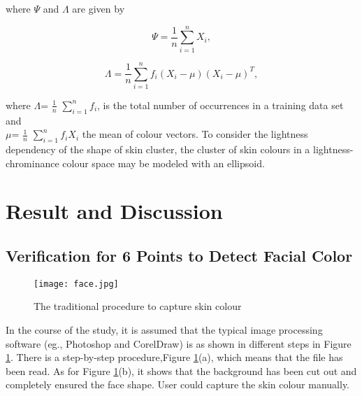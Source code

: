 \documentclass[acmsmall]{acmart}
\begin{document}
\noindent where $\Psi$ and $\Lambda$ are given by


\begin{equation}
\Psi=
\frac{1}{n}
\sum_{i=1}^{n}X_{i},
\end{equation}

\begin{equation}
\Lambda=
\frac{1}{n}
\sum_{i=1}^{n}f_{i}
(X_{i}-\mu)
(X_{i}-\mu)^T,
\end{equation}


\noindent where $\Lambda$=  
$\frac{1}{n}$
$\sum_{i=1}^{n}f_{i}$,
is the total number of occurrences in a training data set and \\
$\mu$=
$\frac{1}{n}$
$\sum_{i=1}^{n}f_{i}X_{i}$ 
the mean of colour vectors. To consider the lightness dependency of the shape of skin cluster, the cluster of skin colours in a lightness-chrominance colour space may be modeled with an ellipsoid.   

\section{Result and Discussion}
\subsection{Verification for 6 Points to Detect Facial Color}
\begin{figure}[h]
    \centering
    \texttt{[image: face.jpg]}
    \caption{The traditional procedure to capture skin colour}
    \label{face}
    \end{figure}
In the course of the study, it is assumed that the typical image processing software (eg., Photoshop and CorelDraw) is as shown in different steps in Figure \ref{face}. There is a step-by-step procedure,Figure \ref{face}(a), which means that the file has been read. As for Figure \ref{face}(b), it shows that the background has been cut out and completely ensured the face shape. User could capture the skin colour manually. 
\end{document}
